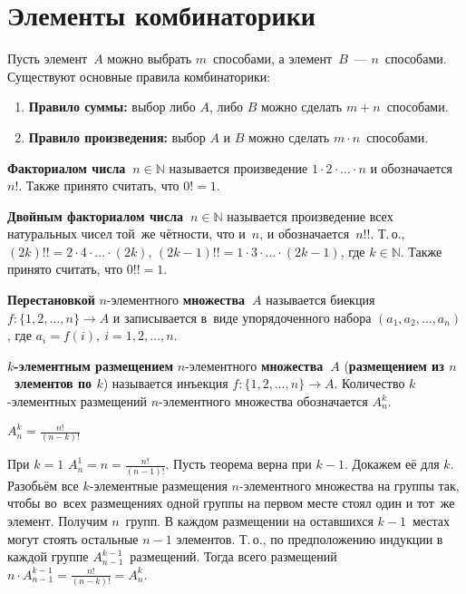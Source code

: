 \section{Элементы комбинаторики}
Пусть элемент~$A$ можно выбрать $m$~способами, а элемент~$B$~--- $n$~способами. Существуют основные правила комбинаторики:
\begin{enumerate}
	\item \textbf{Правило суммы:} выбор либо $A$, либо $B$ можно сделать $m + n$~способами.
	\item \textbf{Правило произведения:} выбор $A$ и $B$ можно сделать $m \cdot n$~способами.
\end{enumerate}

\index{!}  \textbf{Факториалом числа~$n \in \mathbb N$} называется произведение $1 \cdot 2 \cdot \ldots \cdot n$ и обозначается~$n!$.
Также принято считать, что $0! = 1$.

\textbf{Двойным факториалом числа~$n \in \mathbb N$} называется произведение всех натуральных чисел той~же чётности, что и~$n$, и обозначается~$n!!$.
Т.\,о., $(2k)!! = 2 \cdot 4 \cdot \ldots \cdot (2k)$, $(2k - 1)!! = 1 \cdot 3 \cdot \ldots \cdot (2k - 1)$, где $k \in \mathbb N$.
Также принято считать, что $0!! = 1$.

 \textbf{Перестановкой} $n$-элементного \textbf{множества~$A$} называется биекция $f \colon \{ 1, 2, \ldots, n \} \to A$ и записывается в~виде упорядоченного набора $(a_1, a_2, \ldots, a_n)$, где $a_i = f(i), \ i = 1, 2, \ldots, n$.

 \textbf{$k$-элементным размещением} $n$-элементного \textbf{множества~$A$} (\textbf{размещением из $n$~элементов по $k$}) называется инъекция $f \colon \{ 1, 2, \ldots, n \} \to A$.
Количество $k$-элементных размещений $n$-элементного множества обозначается $A_n^k$.

\begin{statement}
$A_n^k = \frac{n!}{(n - k)!}$
\end{statement}
\begin{proofmathind}
	\indbase При $k = 1$ $A_n^1 = n = \frac{n!}{(n - 1)!}$.
	\indstep Пусть теорема верна при $k - 1$.
	Докажем её для $k$.
	Разобьём все $k$-элементные размещения $n$-элементного множества на группы так, чтобы во~всех размещениях одной группы на первом месте стоял один и тот~же элемент.
	Получим $n$~групп.
	В каждом размещении на оставшихся $k - 1$~местах могут стоять остальные $n - 1$ элементов.
	Т.\,о., по предположению индукции в каждой группе $A_{n-1}^{k-1}$~размещений.
	Тогда всего размещений $n \cdot A_{n-1}^{k-1} = \frac{n!}{(n - k)!} = A_n^k$. \indend
\end{proofmathind}

